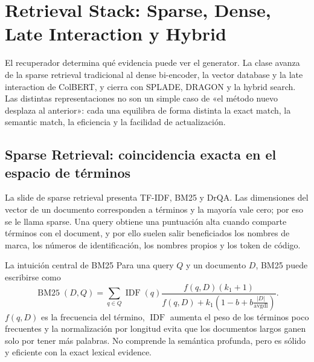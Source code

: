 \section{Retrieval Stack: Sparse, Dense, Late Interaction y Hybrid}

El recuperador determina qué evidencia puede ver el generator. La clase avanza de la sparse retrieval tradicional al dense bi-encoder, la vector database y la late interaction de ColBERT, y cierra con SPLADE, DRAGON y la hybrid search. Las distintas representaciones no son un simple caso de «el método nuevo desplaza al anterior»: cada una equilibra de forma distinta la exact match, la semantic match, la eficiencia y la facilidad de actualización.

\subsection{Sparse Retrieval: coincidencia exacta en el espacio de términos}

La slide de sparse retrieval presenta TF-IDF, BM25 y DrQA. Las dimensiones del vector de un documento corresponden a términos y la mayoría vale cero; por eso se le llama sparse. Una query obtiene una puntuación alta cuando comparte términos con el document, y por ello suelen salir beneficiados los nombres de marca, los números de identificación, los nombres propios y los token de código.


\begin{importantbox}{La intuición central de BM25}
Para una query $Q$ y un documento $D$, BM25 puede escribirse como
\[
\operatorname{BM25}(D,Q)=\sum_{q\in Q}\operatorname{IDF}(q)
\frac{f(q,D)(k_1+1)}{f(q,D)+k_1\left(1-b+b\frac{|D|}{\operatorname{avgdl}}\right)}.
\]
$f(q,D)$ es la frecuencia del término, $\operatorname{IDF}$ aumenta el peso de los términos poco frecuentes y la normalización por longitud evita que los documentos largos ganen solo por tener más palabras. No comprende la semántica profunda, pero es sólido y eficiente con la exact lexical evidence.
\end{importantbox}


